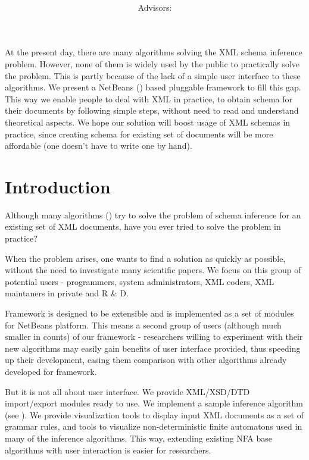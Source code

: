 \documentclass[a4paper,10pt,oneside,twocolumn]{article}
\title{\bf\mftitle}
\author{\mfauthor \\ Advisors: \mfadvisor}
\date{\mfplacedate}
\begin{document}
\maketitle

\abstract
At the present day, there are many algorithms solving the XML schema inference problem.
However, none of them is widely used by the public to practically solve the problem.
This is partly because of the lack of a simple user interface to these algorithms.
We present a NetBeans (\cite{netbeans}) based pluggable framework to fill this gap.
This way we enable people to deal with XML in practice, to obtain schema for their documents by following simple steps, without need to read and understand theoretical aspects.
We hope our solution will boost usage of XML schemas in practice, since creating schema for existing set of documents will be more affordable (one doesn't have to write one by hand).

\section*{Introduction}
Although many algorithms (\cite{ahonen, Bex:2006:ICD:1182635.1164139, Bex:2007:IXS:1325851.1325964, 1802522, vyhnanovska}) 
try to solve the problem of schema inference for an existing set of XML documents, have you ever tried to solve the problem in practice?

When the problem arises, one wants to find a solution as quickly as possible, without the need to investigate many scientific papers.
We focus on this group of potential users - programmers, system administrators, XML coders, XML maintaners in private and R \& D.

Framework is designed to be extensible and is implemented as a set of modules for NetBeans platform.
This means a second group of users (although much smaller in counts) of our framework - researchers willing to experiment with their new algorithms may easily gain benefits of user interface provided, thus speeding up their development, easing them comparison with other algorithms already developed for framework.

But it is not all about user interface.
We provide XML/XSD/DTD import/export modules ready to use.
We implement a sample inference algorithm (see \cite{ahonen}).
We provide visualization tools to display input XML documents as a set of grammar rules, and tools to visualize non-deterministic finite automatons used in many of the inference algorithms.
This way, extending existing NFA base algorithms with user interaction is easier for researchers.
\end{document}
